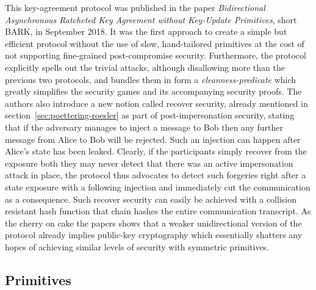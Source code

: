 \documentclass[11pt,a4paper,twoside,openright,bibliography=totoc]{scrbook}
\begin{document}
This key-agreement protocol was published in the paper
\textit{Bidirectional Asynchronous Ratcheted Key Agreement without
Key-Update Primitives}, short BARK, in September 2018. It was the first approach to
create a simple but efficient protocol without the use of slow,
hand-tailored primitives at the cost of not supporting fine-grained
post-compromise security. Furthermore, the protocol explicitly spells
out the trivial attacks, although disallowing more than the previous
two protocols, and bundles them in form a \textit{cleanness-predicate}
which greatly simplifies the security games and its accompanying
security proofs. The authors also introduce a new notion called
recover security, already mentioned in section~\ref{sec:poettering-roesler}
as part of post-impersonation security,
stating that if the adversary manages to inject a message to Bob
then any further message from Alice to Bob will be rejected.
Such an injection can happen after Alice's state has been leaked.
Clearly, if the participants simply recover from the exposure both they may
never detect that there was an active impersonation attack in place,
the protocol thus advocates to detect such forgeries right after a
state exposure with a following injection and immediately cut the communication as a
consequence. Such recover security can easily be achieved with a
collision resistant hash function that chain hashes the entire
communication transcript. As the cherry on cake the papers shows that
a weaker unidirectional version of the protocol already implies
public-key cryptography which essentially shatters any hopes of
achieving similar levels of security with symmetric primitives.

\subsection{Primitives}
\label{sec:primitives-2}
\end{document}
